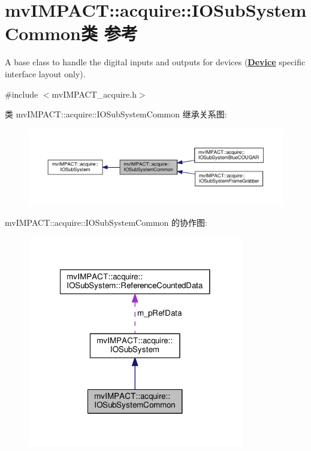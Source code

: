 \hypertarget{classmv_i_m_p_a_c_t_1_1acquire_1_1_i_o_sub_system_common}{\section{mv\+I\+M\+P\+A\+C\+T\+:\+:acquire\+:\+:I\+O\+Sub\+System\+Common类 参考}
\label{classmv_i_m_p_a_c_t_1_1acquire_1_1_i_o_sub_system_common}
}


A base class to handle the digital inputs and outputs for devices ({\bfseries \hyperlink{classmv_i_m_p_a_c_t_1_1acquire_1_1_device}{Device}} specific interface layout only).  




{\ttfamily \#include $<$mv\+I\+M\+P\+A\+C\+T\+\_\+acquire.\+h$>$}



类 mv\+I\+M\+P\+A\+C\+T\+:\+:acquire\+:\+:I\+O\+Sub\+System\+Common 继承关系图\+:
\nopagebreak
\begin{figure}[H]
\begin{center}
\leavevmode
\includegraphics[width=350pt]{classmv_i_m_p_a_c_t_1_1acquire_1_1_i_o_sub_system_common__inherit__graph}
\end{center}
\end{figure}


mv\+I\+M\+P\+A\+C\+T\+:\+:acquire\+:\+:I\+O\+Sub\+System\+Common 的协作图\+:
\nopagebreak
\begin{figure}[H]
\begin{center}
\leavevmode
\includegraphics[width=266pt]{classmv_i_m_p_a_c_t_1_1acquire_1_1_i_o_sub_system_common__coll__graph}
\end{center}
\end{figure}
